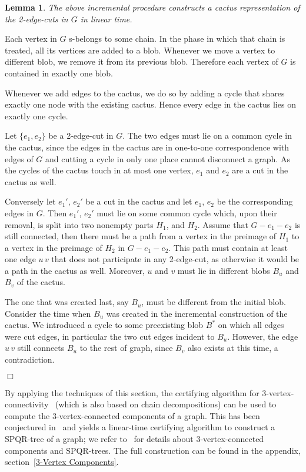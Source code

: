 \documentclass[paper=a4]{scrartcl}
\newtheorem{lemma}{Lemma}
\newcommand{\mqed}{\hfill$\Box$}
\newlength{\proofpostskipamount}\newlength{\proofpreskipamount}
\newenvironment{proof}{\par\vspace{\proofpreskipamount}\noindent{\textbf{Proof:}}\hspace{0.5em}}{\nopagebreak \strut\nopagebreak \hspace{\fill}\mqed\par\vspace{\proofpostskipamount}\noindent}
\newcommand{\edge}[2]{\ensuremath{#1\,#2}}
\begin{document}
\begin{lemma} The above incremental procedure constructs a cactus representation of the 2-edge-cuts in $G$ in linear time.
\end{lemma}
\begin{proof} Each vertex in $G$ s-belongs to some chain. In the phase in which that chain is treated, all its vertices are added to a blob. Whenever we move a vertex to different blob, we remove it from its previous blob. Therefore each vertex of $G$ is contained in exactly one blob.

Whenever we add edges to the cactus, we do so by adding a cycle that shares exactly one node with the existing cactus. Hence every edge in the cactus lies on exactly one cycle.

Let $\{e_1,e_2\}$ be a 2-edge-cut in $G$. The two edges must lie on a common cycle in the cactus, since the edges in the cactus are in one-to-one correspondence with edges of $G$ and cutting a cycle in only one place cannot disconnect a graph. As the cycles of the cactus touch in at most one vertex, $e_1$ and $e_2$ are a cut in the cactus as well.

Conversely let $e_1'$, $e_2'$ be a cut in the cactus and let $e_1$, $e_2$ be the corresponding edges in $G$. Then $e_1'$, $e_2'$ must lie on some common cycle which, upon their removal, is split into two nonempty parts $H_1$, and $H_2$. Assume that $G -e_1 -e_2$ is still connected, then there must be a path from a vertex in the preimage of $H_1$ to a vertex in the preimage of $H_2$ in $G-e_1-e_2$. This path must contain at least one edge $\edge uv$ that does not participate in any 2-edge-cut, as otherwise it would be a path in the cactus as well. Moreover, $u$ and $v$ must lie in different blobs $B_u$ and $B_v$ of the cactus.

The one that was created last, say $B_u$, must be different from the initial blob. Consider the time when $B_u$ was created in the incremental construction of the cactus. We introduced a cycle to some preexisting blob $B^*$ on which all edges were cut edges, in particular the two cut edges incident to $B_u$. However, the edge $\edge uv$ still connects $B_u$ to the rest of graph, since $B_v$ also exists at this time, a contradiction.
\end{proof}

By applying the techniques of this section, the certifying algorithm for $3$-vertex-connectivity~\cite{Schmidt2013} (which is also based on chain decompositions) can be used to compute the $3$-vertex-connected components of a graph. This has been conjectured in~\cite[p.\ 18]{Schmidt2010b} and yields a linear-time certifying algorithm to construct a SPQR-tree of a graph; we refer to~\cite{Hopcroft1973,Gutwenger2001} for details about $3$-vertex-connected components and SPQR-trees. The full construction can be found in the appendix, section~\ref{3-Vertex Components}.
\end{document}
